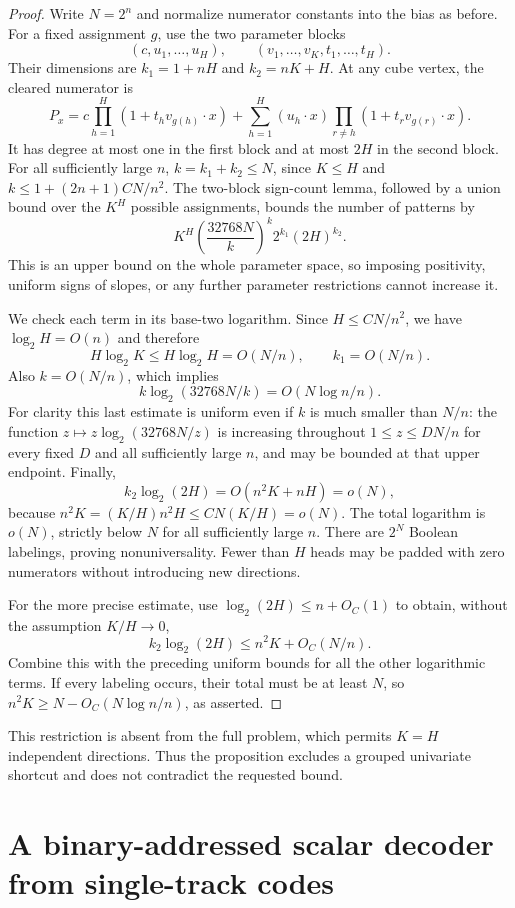 \documentclass[11pt]{article}
\begin{document}
\begin{proof}
Write $N=2^n$ and normalize numerator constants into the bias as before.
For a fixed assignment $g$, use the two parameter blocks
\[
 (c,u_1,\ldots,u_H),\qquad
 (v_1,\ldots,v_K,t_1,\ldots,t_H).
\]
Their dimensions are $k_1=1+nH$ and $k_2=nK+H$.
At any cube vertex, the cleared numerator is
\[
 P_x=c\prod_{h=1}^H(1+t_hv_{g(h)}\cdot x)
 +\sum_{h=1}^H(u_h\cdot x)
       \prod_{r\ne h}(1+t_rv_{g(r)}\cdot x).
\]
It has degree at most one in the first block and at most $2H$ in
the second block. For all sufficiently large $n$,
$k=k_1+k_2\leq N$, since $K\leq H$ and
$k\leq1+(2n+1)CN/n^2$.
The two-block sign-count lemma, followed by a union bound over the
$K^H$ possible assignments, bounds the number of patterns by
\[
 K^H\left(\frac{32768N}{k}\right)^k
       2^{k_1}(2H)^{k_2}.
\]
This is an upper bound on the whole parameter space, so imposing
positivity, uniform signs of slopes, or any further parameter
restrictions cannot increase it.

We check each term in its base-two logarithm. Since
$H\leq CN/n^2$, we have $\log_2 H=O(n)$ and therefore
\[
 H\log_2 K\leq H\log_2 H=O(N/n),\qquad
 k_1=O(N/n).
\]
Also $k=O(N/n)$, which implies
\[
 k\log_2(32768N/k)=O(N\log n/n).
\]
For clarity this last estimate is uniform even if $k$ is much
smaller than $N/n$: the function
$z\mapsto z\log_2(32768N/z)$ is increasing throughout
$1\leq z\leq D N/n$ for every fixed $D$ and all sufficiently
large $n$, and may be bounded at that upper endpoint.
Finally,
\[
 k_2\log_2(2H)=O(n^2K+nH)=o(N),
\]
because $n^2K=(K/H)n^2H\leq CN(K/H)=o(N)$.
The total logarithm is $o(N)$, strictly below $N$ for all
sufficiently large $n$. There are $2^N$ Boolean labelings, proving
nonuniversality. Fewer than $H$ heads may be padded with zero
numerators without introducing new directions.

For the more precise estimate, use
$\log_2(2H)\leq n+O_C(1)$ to obtain, without the assumption
$K/H\to0$,
\[
 k_2\log_2(2H)\leq n^2K+O_C(N/n).
\]
Combine this with the preceding uniform bounds for all the other
logarithmic terms. If every labeling occurs, their total must be at
least $N$, so
$n^2K\geq N-O_C(N\log n/n)$, as asserted.
\end{proof}

This restriction is absent from the full problem, which permits
$K=H$ independent directions. Thus the proposition excludes a grouped
univariate shortcut and does not contradict the requested bound.

\section{A binary-addressed scalar decoder from single-track codes}
\end{document}
